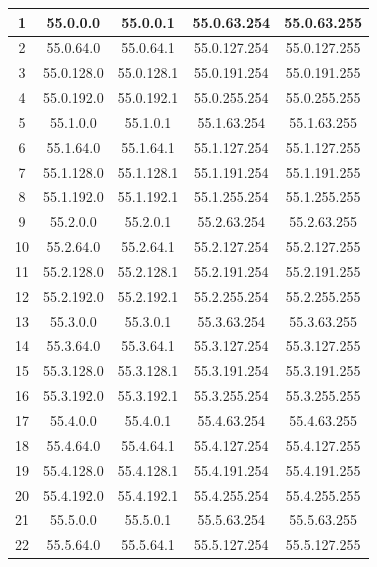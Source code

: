 \documentclass[letterpaper,12pt]{article}
\begin{document}
\begin{center}
\begin{longtable}{|c|c|c|c|c|}
                1 & 55.0.0.0 & 55.0.0.1 & 55.0.63.254 & 55.0.63.255 \\ \hline
                2 & 55.0.64.0 & 55.0.64.1 & 55.0.127.254 & 55.0.127.255 \\ \hline
                3 & 55.0.128.0 & 55.0.128.1 & 55.0.191.254 & 55.0.191.255 \\ \hline
                4 & 55.0.192.0 & 55.0.192.1 & 55.0.255.254 & 55.0.255.255 \\ \hline
                5 & 55.1.0.0 & 55.1.0.1 & 55.1.63.254 & 55.1.63.255 \\ \hline
                6 & 55.1.64.0 & 55.1.64.1 & 55.1.127.254 & 55.1.127.255 \\ \hline
                7 & 55.1.128.0 & 55.1.128.1 & 55.1.191.254 & 55.1.191.255 \\ \hline
                8 & 55.1.192.0 & 55.1.192.1 & 55.1.255.254 & 55.1.255.255 \\ \hline
                9 & 55.2.0.0 & 55.2.0.1 & 55.2.63.254 & 55.2.63.255 \\ \hline
                10 & 55.2.64.0 & 55.2.64.1 & 55.2.127.254 & 55.2.127.255 \\ \hline
                11 & 55.2.128.0 & 55.2.128.1 & 55.2.191.254 & 55.2.191.255 \\ \hline
                12 & 55.2.192.0 & 55.2.192.1 & 55.2.255.254 & 55.2.255.255 \\ \hline
                13 & 55.3.0.0 & 55.3.0.1 & 55.3.63.254 & 55.3.63.255 \\ \hline
                14 & 55.3.64.0 & 55.3.64.1 & 55.3.127.254 & 55.3.127.255 \\ \hline
                15 & 55.3.128.0 & 55.3.128.1 & 55.3.191.254 & 55.3.191.255 \\ \hline
                16 & 55.3.192.0 & 55.3.192.1 & 55.3.255.254 & 55.3.255.255 \\ \hline
                17 & 55.4.0.0 & 55.4.0.1 & 55.4.63.254 & 55.4.63.255 \\ \hline
                18 & 55.4.64.0 & 55.4.64.1 & 55.4.127.254 & 55.4.127.255 \\ \hline
                19 & 55.4.128.0 & 55.4.128.1 & 55.4.191.254 & 55.4.191.255 \\ \hline
                20 & 55.4.192.0 & 55.4.192.1 & 55.4.255.254 & 55.4.255.255 \\ \hline
                21 & 55.5.0.0 & 55.5.0.1 & 55.5.63.254 & 55.5.63.255 \\ \hline
                22 & 55.5.64.0 & 55.5.64.1 & 55.5.127.254 & 55.5.127.255 \\ \hline

\end{longtable}
\end{center}
\end{document}

